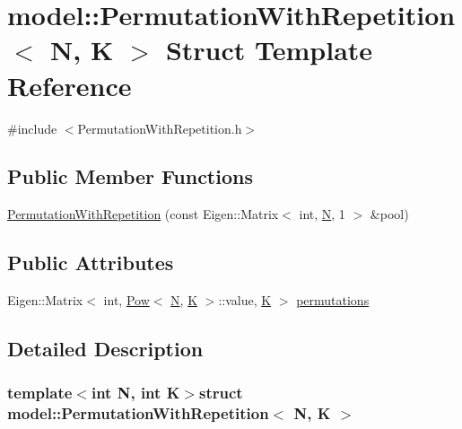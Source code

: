 \hypertarget{structmodel_1_1_permutation_with_repetition}{}\section{model\+:\+:Permutation\+With\+Repetition$<$ N, K $>$ Struct Template Reference}
\label{structmodel_1_1_permutation_with_repetition}


{\ttfamily \#include $<$Permutation\+With\+Repetition.\+h$>$}

\subsection*{Public Member Functions}
\begin{DoxyCompactItemize}
\item 
\hyperlink{structmodel_1_1_permutation_with_repetition_a06c071fe181dcc225e78da6aa6f71d6d}{Permutation\+With\+Repetition} (const Eigen\+::\+Matrix$<$ int, \hyperlink{thompson__tetrahedron_8m_a7823765a845eb81829f110d8337f81ae}{N}, 1 $>$ \&pool)
\end{DoxyCompactItemize}
\subsection*{Public Attributes}
\begin{DoxyCompactItemize}
\item 
Eigen\+::\+Matrix$<$ int, \hyperlink{structmodel_1_1_pow}{Pow}$<$ \hyperlink{thompson__tetrahedron_8m_a7823765a845eb81829f110d8337f81ae}{N}, \hyperlink{_spline_node_base__corder2_8h_a0e8c316898283983f43b1a7e2d5fd1ba}{K} $>$\+::value, \hyperlink{_spline_node_base__corder2_8h_a0e8c316898283983f43b1a7e2d5fd1ba}{K} $>$ \hyperlink{structmodel_1_1_permutation_with_repetition_a5a5d12c18addbe535073ae67c8e35f6d}{permutations}
\end{DoxyCompactItemize}


\subsection{Detailed Description}
\subsubsection*{template$<$int N, int K$>$struct model\+::\+Permutation\+With\+Repetition$<$ N, K $>$}



